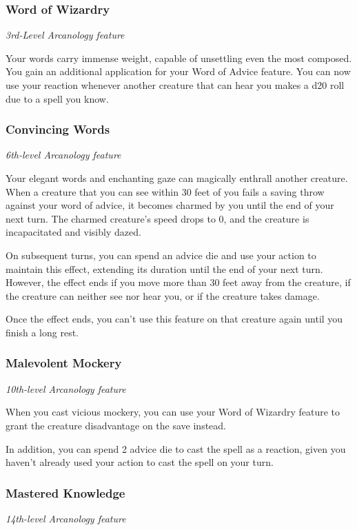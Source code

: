 \documentclass[letterpaper,openany,twoside,twocolumn]{book}
\begin{document}
	\subsubsection*{Word of Wizardry}
	\textnormal{\textit{3rd-Level Arcanology feature}}
	
	Your words carry immense weight, capable of unsettling even the most composed. You gain an additional application for your Word of Advice feature. You can now use your reaction whenever another creature that can hear you makes a d20 roll due to a spell you know.
	
	\subsubsection*{Convincing Words}
	\textnormal{\textit{6th-level Arcanology feature}}
	
	Your elegant words and enchanting gaze can magically enthrall another creature. When a creature that you can see within 30 feet of you fails a saving throw against your word of advice, it becomes charmed by you until the end of your next turn. The charmed creature’s speed drops to 0, and the creature is incapacitated and visibly dazed.
	
	On subsequent turns, you can spend an advice die and use your action to maintain this effect, extending its duration until the end of your next turn. However, the effect ends if you move more than 30 feet away from the creature, if the creature can neither see nor hear you, or if the creature takes damage.
	
	Once the effect ends, you can’t use this feature on that creature again until you finish a long rest.
	
	\subsubsection*{Malevolent Mockery}
	\textnormal{\textit{10th-level Arcanology feature}}
	
	When you cast vicious mockery, you can use your Word of Wizardry feature to grant the creature disadvantage on the save instead.
	
	In addition, you can spend 2 advice die to cast the spell as a reaction, given you haven't already used your action to cast the spell on your turn.
	
	\subsubsection*{Mastered Knowledge}
	\textnormal{\textit{14th-level Arcanology feature}}
	
\end{document}
